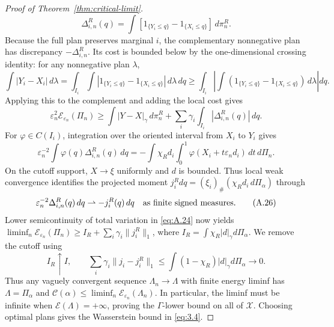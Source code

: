 \begin{proof}[Proof of Theorem~\ref{thm:critical-limit}]
\begin{equation}
\Delta_{i,n}^R(q)=\int[1_{\{Y_i\le q\}}-1_{\{X_i\le q\}}]\,d\pi_n^R.
\tag{A.23}\label{eq:A.23}
\end{equation}
Because the full plan preserves marginal \(i\), the complementary nonnegative plan has discrepancy \(-\Delta_{i,n}^R\). Its cost is bounded below by the one-dimensional crossing identity: for any nonnegative plan \(\lambda\),
\[
\int|Y_i-X_i|\,d\lambda
=\int_{I_i}\int|1_{\{Y_i\le q\}}-1_{\{X_i\le q\}}|\,d\lambda\,dq
\ge\int_{I_i}\left|\int(1_{\{Y_i\le q\}}-1_{\{X_i\le q\}})\,d\lambda\right|dq.
\]
Applying this to the complement and adding the local cost gives
\begin{equation}
\varepsilon_n^2\mathcal E_{\varepsilon_n}(\Pi_n)\ge
\int|Y-X|_\gamma\,d\pi_n^R
+\sum_i\gamma_i\int_{I_i}|\Delta_{i,n}^R(q)|\,dq.
\tag{A.24}\label{eq:A.24}
\end{equation}
For \(\varphi\in C(I_i)\), integration over the oriented interval from \(X_i\) to \(Y_i\) gives
\begin{equation}
\varepsilon_n^{-2}\int\varphi(q)\Delta_{i,n}^R(q)\,dq
=-\int\chi_Rd_i\int_0^1\varphi(X_i+t\varepsilon_nd_i)\,dt\,d\Pi_n.
\tag{A.25}\label{eq:A.25}
\end{equation}
On the cutoff support, \(X\to\xi\) uniformly and \(d\) is bounded. Thus local weak convergence identifies the projected moment \(j_i^Rdq=(\xi_i)_\#(\chi_Rd_i\,d\Pi_\alpha)\) through
\begin{equation}
\varepsilon_n^{-2}\Delta_{i,n}^R(q)\,dq
\rightharpoonup-j_i^R(q)\,dq
\quad\hbox{as finite signed measures.}
\tag{A.26}\label{eq:A.26}
\end{equation}
Lower semicontinuity of total variation in \eqref{eq:A.24} now yields \(\liminf_n\mathcal E_{\varepsilon_n}(\Pi_n)\ge I_R+\sum_i\gamma_i\|j_i^R\|_1\), where \(I_R=\int\chi_R|d|_\gamma d\Pi_\alpha\). We remove the cutoff using
\begin{equation}
I_R\uparrow I,\qquad
\sum_i\gamma_i\|j_i-j_i^R\|_1
\le\int(1-\chi_R)|d|_\gamma d\Pi_\alpha\to0.
\tag{A.27}\label{eq:A.27}
\end{equation}
Thus any vaguely convergent sequence \(\Lambda_n\to\Lambda\) with finite energy liminf has \(\Lambda=\Pi_\alpha\) and \(\mathcal C(\alpha)\le\liminf_n\mathcal E_{\varepsilon_n}(\Lambda_n)\). In particular, the liminf must be infinite when \(\mathcal E(\Lambda)=+\infty\), proving the \(\Gamma\)-lower bound on all of \(\mathscr X\). Choosing optimal plans gives the Wasserstein bound in \eqref{eq:3.4}.


\end{proof}
